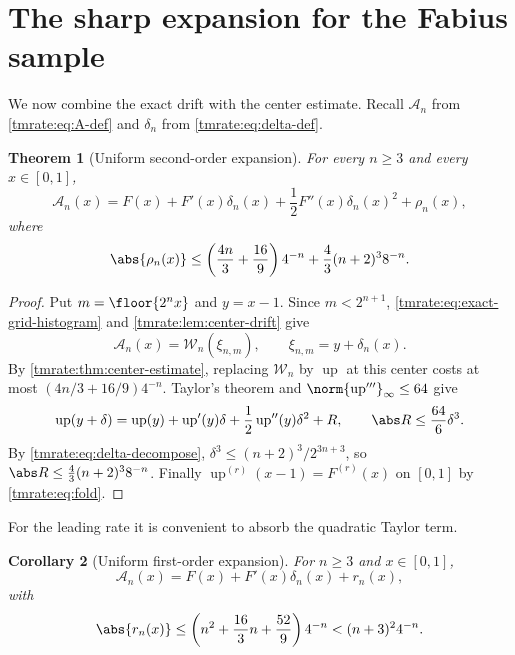 \documentclass[11pt,oneside]{article}
\newtheorem{theorem}{Theorem}[section]
\newtheorem{corollary}[theorem]{Corollary}
\theoremstyle{definition}
\theoremstyle{remark}
\newcommand{\Up}{\operatorname{up}}
\begin{document}
\section{The sharp expansion for the Fabius sample}
\label{tmrate:sec:main-rate}

We now combine the exact drift with the center estimate.  Recall
$\mathcal A_n$ from \eqref{tmrate:eq:A-def} and $\delta_n$ from \eqref{tmrate:eq:delta-def}.

\begin{theorem}[Uniform second-order expansion]
\label{tmrate:thm:second-order-expansion}
For every $n\ge3$ and every $x\in[0,1]$,
\begin{equation}
 \boxed{\displaystyle
 \mathcal A_n(x)
 =F(x)+F'(x)\delta_n(x)
 +\frac12F''(x)\delta_n(x)^2+\rho_n(x),}                   \label{tmrate:eq:second-order-expansion}
\end{equation}
where
\begin{equation}
 \abs{\rho_n(x)}\le
 \left(\frac{4n}{3}+\frac{16}{9}\right)4^{-n}
 +\frac43(n+2)^3 8^{-n}.                                  \label{tmrate:eq:second-order-remainder}
\end{equation}
\end{theorem}

\begin{proof}
Put $m=\floor{2^n x}$ and $y=x-1$.  Since $m<2^{n+1}$,
\eqref{tmrate:eq:exact-grid-histogram} and \cref{tmrate:lem:center-drift} give
\begin{equation*}
 \mathcal A_n(x)=\mathcal W_n(\xi_{n,m}),
 \qquad
 \xi_{n,m}=y+\delta_n(x).
\end{equation*}
By \cref{tmrate:thm:center-estimate}, replacing $\mathcal W_n$ by $\Up$ at this center
costs at most $(4n/3+16/9)4^{-n}$.  Taylor's theorem and
$\norm{\Up'''}_\infty\le64$ give
\begin{equation*}
 \Up(y+\delta)=\Up(y)+\Up'(y)\delta+\frac12\Up''(y)\delta^2+R,
 \qquad \abs R\le\frac{64}{6}\delta^3.
\end{equation*}
By \eqref{tmrate:eq:delta-decompose},
$\delta^3\le(n+2)^3/2^{3n+3}$, so
$\abs R\le\frac43(n+2)^3 8^{-n}$.  Finally
$\Up^{(r)}(x-1)=F^{(r)}(x)$ on $[0,1]$ by \eqref{tmrate:eq:fold}.
\end{proof}

For the leading rate it is convenient to absorb the quadratic Taylor term.

\begin{corollary}[Uniform first-order expansion]
\label{tmrate:cor:first-order-expansion}
For $n\ge3$ and $x\in[0,1]$,
\begin{equation}
 \mathcal A_n(x)=F(x)+F'(x)\delta_n(x)+r_n(x),              \label{tmrate:eq:first-order-expansion}
\end{equation}
with
\begin{equation}
 \abs{r_n(x)}\le
 \left(n^2+\frac{16}{3}n+\frac{52}{9}\right)4^{-n}
 <(n+3)^2 4^{-n}.                                         \label{tmrate:eq:first-order-remainder}
\end{equation}
\end{corollary}
\end{document}
